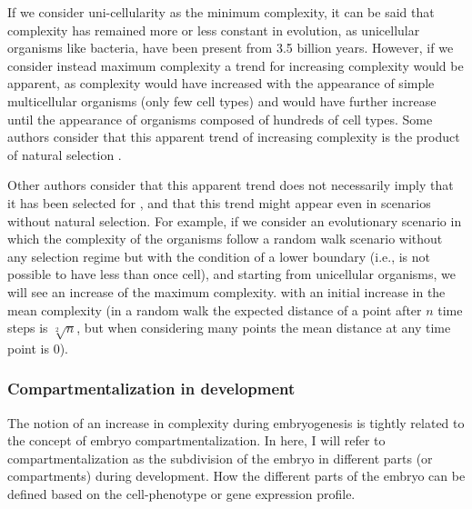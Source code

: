 If we consider uni-cellularity as the minimum complexity, it can be said that complexity has remained more or less constant in evolution, as unicellular organisms like bacteria, have been present from 3.5 billion years. However, if we consider instead maximum complexity a trend for increasing complexity would be apparent, as complexity would have increased with the appearance of simple multicellular organisms (only few cell types) and would have further increase until the appearance of organisms composed of hundreds of cell types. Some authors consider that this apparent trend of increasing complexity is the product of natural selection \citep{bonner1988evolution,Carroll2001}.

Other authors consider that this apparent trend does not necessarily imply that it has been selected for \citep{McShea2015}, and that this trend might appear even in scenarios without natural selection. 
For example, if we consider an evolutionary scenario in which the complexity of the organisms follow a random walk scenario without any selection regime but with the condition of a lower boundary (i.e., is not possible to have less than once cell), and starting from unicellular organisms, we will see an increase of the maximum complexity. with an initial increase in the mean complexity (in a random walk the expected distance of a point after $n$ time steps is $\sqrt[2]{n}$, but when considering many points the mean distance at any time point is 0).

\subsubsection{Compartmentalization in development}

The notion of an increase in complexity during embryogenesis is tightly related to the concept of embryo compartmentalization.
%
In here, I will refer to compartmentalization as the subdivision of the embryo in different parts (or compartments) during development. 
How the different parts of the embryo can be defined based on the cell-phenotype or gene expression profile.

